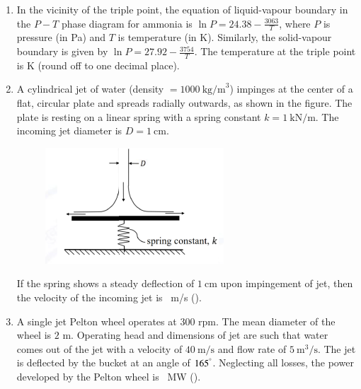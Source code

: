 \documentclass[journal]{IEEEtran}
\begin{document}
\begin{enumerate}
\hfill{}

\item In the vicinity of the triple point, the equation of liquid-vapour boundary in the $P-T$ phase diagram for ammonia is $\ln P = 24.38 - \frac{3063}{T}$, where $P$ is pressure (in Pa) and $T$ is temperature (in K). Similarly, the solid-vapour boundary is given by $\ln P = 27.92 - \frac{3754}{T}$. The temperature at the triple point is \underline{\hspace{2cm}} K (round off to one decimal place).

\hfill{}


\item A cylindrical jet of water (density $=1000~\text{kg/m}^3$) impinges at the center of a flat, circular plate and spreads radially outwards, as shown in the figure. The plate is resting on a linear spring with a spring constant $k=1~\text{kN/m}$. The incoming jet diameter is $D=1~\text{cm}$.
\begin{figure}[h]
\centering
\includegraphics[width=0.5\columnwidth]{Figs/image (52).png}
\caption*{}
\label{fig:47}
\end{figure}

If the spring shows a steady deflection of $1~\text{cm}$ upon impingement of jet, then the velocity of the incoming jet is \underline{\hspace{2cm}}~m/s ().

\hfill{}

\item A single jet Pelton wheel operates at $300$ rpm. The mean diameter of the wheel is $2$ m. Operating head and dimensions of jet are such that water comes out of the jet with a velocity of $40~\text{m/s}$ and flow rate of $5~\text{m}^3/\text{s}$. The jet is deflected by the bucket at an angle of $165^\degree$. Neglecting all losses, the power developed by the Pelton wheel is \underline{\hspace{2cm}}~MW ().


\end{enumerate}
\end{document}
